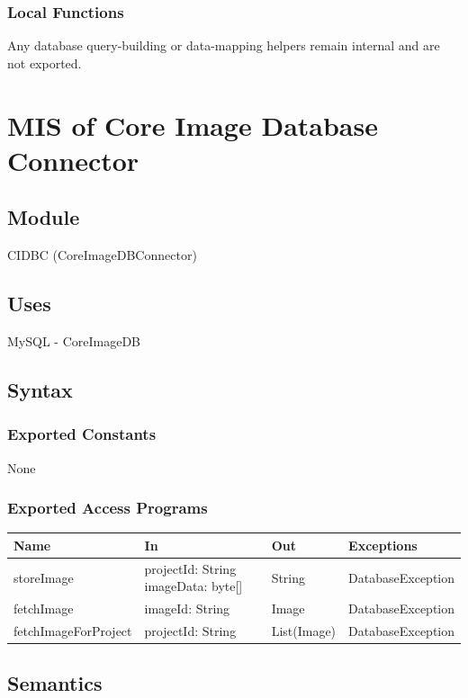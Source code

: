 \documentclass[12pt, titlepage]{article}
\begin{document}
    \subsubsection{Local Functions}
        Any database query-building or data-mapping helpers remain internal and are not exported.

\section{MIS of Core Image Database Connector} \label{cidbc}
    \subsection{Module}
        CIDBC (CoreImageDBConnector)

    \subsection{Uses}
        MySQL - CoreImageDB

    \subsection{Syntax}
    \subsubsection{Exported Constants}
        None

    \subsubsection{Exported Access Programs}
    \begin{center}\begin{tabular}{p{3cm} p{4cm} p{3cm} p{3cm}}
    \hline\textbf{Name} & \textbf{In} & \textbf{Out} & \textbf{Exceptions} \\
    \hline
        storeImage & projectId: String imageData: byte[] & String & DatabaseException \\
        fetchImage & imageId: String & Image & DatabaseException \\
        fetchImageForProject & projectId: String & List(Image) & DatabaseException \\
    \hline
    \end{tabular}\end{center}

    \subsection{Semantics}
\end{document}
